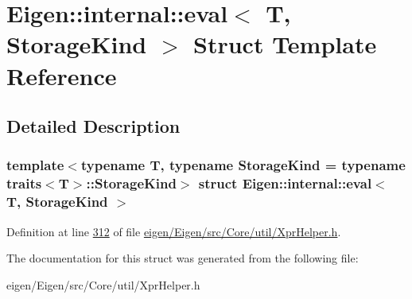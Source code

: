 \hypertarget{struct_eigen_1_1internal_1_1eval}{}\section{Eigen\+:\+:internal\+:\+:eval$<$ T, Storage\+Kind $>$ Struct Template Reference}
\label{struct_eigen_1_1internal_1_1eval}


\subsection{Detailed Description}
\subsubsection*{template$<$typename T, typename Storage\+Kind = typename traits$<$\+T$>$\+::\+Storage\+Kind$>$\newline
struct Eigen\+::internal\+::eval$<$ T, Storage\+Kind $>$}



Definition at line \hyperlink{eigen_2_eigen_2src_2_core_2util_2_xpr_helper_8h_source_l00312}{312} of file \hyperlink{eigen_2_eigen_2src_2_core_2util_2_xpr_helper_8h_source}{eigen/\+Eigen/src/\+Core/util/\+Xpr\+Helper.\+h}.



The documentation for this struct was generated from the following file\+:\begin{DoxyCompactItemize}
\item 
eigen/\+Eigen/src/\+Core/util/\+Xpr\+Helper.\+h\end{DoxyCompactItemize}
